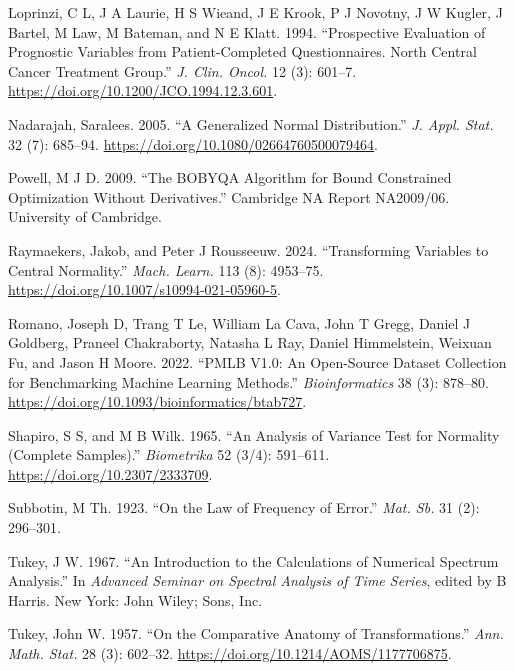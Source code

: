 \documentclass[
  a4paper,
]{article}
\newlength{\cslhangindent}
\newenvironment{CSLReferences}[2] %
 {\begin{list}{}{%
  \setlength{\itemindent}{0pt}
  \setlength{\leftmargin}{0pt}
  \setlength{\parsep}{0pt}
  \ifodd #1
   \setlength{\leftmargin}{\cslhangindent}
   \setlength{\itemindent}{-1\cslhangindent}
  \fi
  \setlength{\itemsep}{#2\baselineskip}}}
 {\end{list}}
\begin{document}
\begin{CSLReferences}{1}{0}
Loprinzi, C L, J A Laurie, H S Wieand, J E Krook, P J Novotny, J W
Kugler, J Bartel, M Law, M Bateman, and N E Klatt. 1994. {``Prospective
Evaluation of Prognostic Variables from Patient-Completed
Questionnaires. North Central Cancer Treatment Group.''} \emph{J. Clin.
Oncol.} 12 (3): 601--7. \url{https://doi.org/10.1200/JCO.1994.12.3.601}.

Nadarajah, Saralees. 2005. {``A Generalized Normal Distribution.''}
\emph{J. Appl. Stat.} 32 (7): 685--94.
\url{https://doi.org/10.1080/02664760500079464}.

Powell, M J D. 2009. {``The {BOBYQA} Algorithm for Bound Constrained
Optimization Without Derivatives.''} Cambridge NA Report NA2009/06.
University of Cambridge.

Raymaekers, Jakob, and Peter J Rousseeuw. 2024. {``Transforming
Variables to Central Normality.''} \emph{Mach. Learn.} 113 (8):
4953--75. \url{https://doi.org/10.1007/s10994-021-05960-5}.

Romano, Joseph D, Trang T Le, William La Cava, John T Gregg, Daniel J
Goldberg, Praneel Chakraborty, Natasha L Ray, Daniel Himmelstein,
Weixuan Fu, and Jason H Moore. 2022. {``{PMLB} V1.0: An Open-Source
Dataset Collection for Benchmarking Machine Learning Methods.''}
\emph{Bioinformatics} 38 (3): 878--80.
\url{https://doi.org/10.1093/bioinformatics/btab727}.

Shapiro, S S, and M B Wilk. 1965. {``An Analysis of Variance Test for
Normality (Complete Samples).''} \emph{Biometrika} 52 (3/4): 591--611.
\url{https://doi.org/10.2307/2333709}.

Subbotin, M Th. 1923. {``On the Law of Frequency of Error.''} \emph{Mat.
Sb.} 31 (2): 296--301.

Tukey, J W. 1967. {``An Introduction to the Calculations of Numerical
Spectrum Analysis.''} In \emph{Advanced Seminar on Spectral Analysis of
Time Series}, edited by B Harris. New York: John Wiley; Sons, Inc.

Tukey, John W. 1957. {``On the Comparative Anatomy of
Transformations.''} \emph{Ann. Math. Stat.} 28 (3): 602--32.
\url{https://doi.org/10.1214/AOMS/1177706875}.


\end{CSLReferences}
\end{document}
